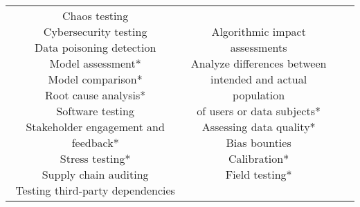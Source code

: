 \documentclass[fleqn]{article}
\begin{document}
\begin{landscape}
\begin{table}[H]
\begin{tabular}{|c|c|c|c|}
{			\textbullet\hspace{3pt} Chaos testing \\ 
			\textbullet\hspace{3pt} Cybersecurity testing \\ 
			\textbullet\hspace{3pt} Data poisoning detection \\ 
			\textbullet\hspace{3pt} Model assessment*\\ 
			\textbullet\hspace{3pt} Model comparison*\\ 
			\textbullet\hspace{3pt} Root cause analysis*\\ 
			\textbullet\hspace{3pt} Software testing \\ 
			\textbullet\hspace{3pt} Stakeholder engagement and feedback*\\ 
			\textbullet\hspace{3pt} Stress testing*\\ 
			\textbullet\hspace{3pt} Supply chain auditing \\ 
			\textbullet\hspace{3pt} Testing third-party dependencies \\
		}
		& \makecell[l]{
			\textbullet\hspace{3pt} Algorithmic impact\\\hspace{10pt}assessments\\  	
			\textbullet\hspace{3pt} Analyze differences between\\\hspace{10pt}intended and actual population\\\hspace{10pt}of users or data subjects*\\ 			
			\textbullet\hspace{3pt} Assessing data quality*\\  		
			\textbullet\hspace{3pt} Bias bounties\\  	
			\textbullet\hspace{3pt} Calibration*\\  	
			\textbullet\hspace{3pt} Field testing*\\  	
}
\end{tabular}
\end{table}
\end{landscape}
\end{document}
